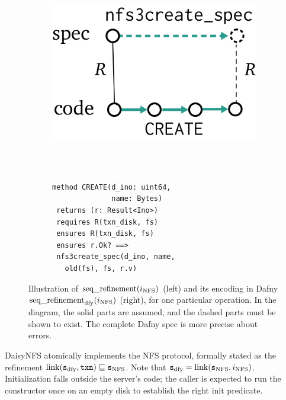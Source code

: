 \begin{figure}
  \centering
  \begin{subfigure}{0.25\textwidth}
    \includegraphics{fig/sequential-refinement.png}
  \end{subfigure}~~~~~\vrule~~~~%
\begin{subfigure}{0.3\textwidth}
  {\small
\begin{verbatim}

method CREATE(d_ino: uint64,
              name: Bytes)
 returns (r: Result<Ino>)
 requires R(txn_disk, fs)
 ensures R(txn_disk, fs)
 ensures r.Ok? ==>
 nfs3create_spec(d_ino, name,
   old(fs), fs, r.v)
\end{verbatim}
}
\end{subfigure}
\vspace{0.5\baselineskip}
  \caption[Illustration of sequential refinement and its Dafny encoding]%
  {Illustration of $\operatorname{seq\_refinement}(i_{\mathrm{NFS}})$ (left) and its encoding
in Dafny $\operatorname{seq\_refinement}_{\mathrm{dfy}}(i_{\mathrm{NFS}})$ (right), for one particular operation.
In the diagram, the solid parts are assumed, and the
dashed parts must be shown to exist. The complete Dafny spec is more precise about
errors.}
  \label{fig:refinement}
\end{figure}

\begin{theorem}
  DaisyNFS atomically implements the NFS protocol, formally stated as the
  refinement $\mathrm{link}(\texttt{s}_{\mathrm{dfy}}, \texttt{txn}) \sqsubseteq \texttt{s}_{\mathrm{NFS}}$. Note that
  $\texttt{s}_{\mathrm{dfy}} = \mathrm{link}(\texttt{s}_{\mathrm{NFS}}, i_{\mathrm{NFS}})$. Initialization falls outside the
  server's code; the caller is expected to run the  constructor once on
  an empty disk to establish the right $\mathrm{init}$ predicate.
  \label{thm:daisy-correctness}
\end{theorem}

